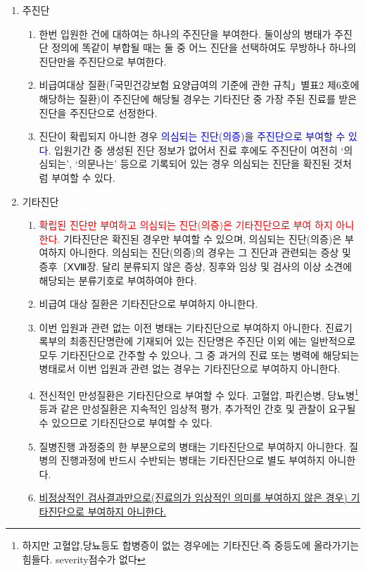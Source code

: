 \prezi{\clearpage}
\begin{tcolorbox}[frogbox,title=주진단과 기타진단에 대한이해]
\begin{enumerate}[가.]\tightlist
\item 주진단
	\begin{enumerate}[(1)]\tightlist
	\item 한번 입원한 건에 대하여는 하나의 주진단을 부여한다. 둘이상의 병태가 주진단 정의에 똑같이 부합될 때는 둘 중 어느 진단을 선택하여도 무방하나 하나의 진단만을 주진단으로 부여한다.
	\item 비급여대상 질환(「국민건강보험 요양급여의 기준에 관한 규칙」별표2 제6호에 해당하는 질환)이 주진단에 해당될 경우는 기타진단 중 가장 주된 진료를 받은 진단을 주진단으로 선정한다.
	\item 진단이 확립되지 아니한 경우 \textcolor{blue}{의심되는 진단(의증)을 주진단으로 부여할 수 있다.} 입원기간 중 생성된 진단 정보가 없어서 진료 후에도 주진단이 여전히 ‘의심되는’, ‘의문나는’ 등으로 기록되어 있는 경우 의심되는 진단을 확진된 것처럼 부여할 수 있다.
	\end{enumerate}
\item 기타진단
\begin{enumerate}[(1)]\tightlist
\item \textcolor{red}{확립된 진단만 부여하고 의심되는 진단(의증)은 기타진단으로 부여 하지 아니한다.} 기타진단은 확진된 경우만 부여할 수 있으며, 의심되는 진단(의증)은 부여하지 아니한다. 의심되는 진단(의증)의 경우는 그 진단과 관련되는 증상 및 증후〔ⅩⅧ장. 달리 분류되지 않은 증상, 징후와 임상 및 검사의 이상 소견에 해당되는 분류기호로 부여하여야 한다.
\item 비급여 대상 질환은 기타진단으로 부여하지 아니한다.
\item 이번 입원과 관련 없는 이전 병태는 기타진단으로 부여하지 아니한다. 진료기록부의 최종진단명란에 기재되어 있는 진단명은 주진단 이외 에는 일반적으로 모두 기타진단으로 간주할 수 있으나, 그 중 과거의 진료 또는 병력에 해당되는 병태로서 이번 입원과 관련 없는 경우는 기타진단으로 부여하지 아니한다.
\item 전신적인 만성질환은 기타진단으로 부여할 수 있다. 고혈압, 파킨슨병, 당뇨병\footnote{하지만 고혈압,당뇨등도 합병증이 없는 경우에는 기타진단.즉 중등도에 올라가기는 힘들다. severity점수가 없다} 등과 같은 만성질환은 지속적인 임상적 평가, 추가적인 간호 및 관찰이 요구될 수 있으므로 기타진단으로 부여할 수 있다.
\item 질병진행 과정중의 한 부분으로의 병태는 기타진단으로 부여하지 아니한다. 질병의 진행과정에 반드시 수반되는 병태는 기타진단으로 별도 부여하지 아니한다.
\item \uline{비정상적인 검사결과만으로(진료의가 임상적인 의미를 부여하지 않은 경우) 기타진단으로 부여하지 아니한다.}
\end{enumerate}
\end{enumerate}
\end{tcolorbox}
\prezi{\clearpage}

